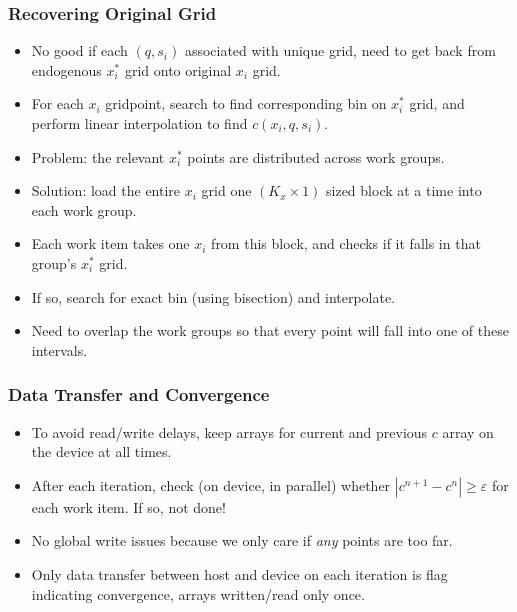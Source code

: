 \documentclass[handout]{beamer}
\newcommand{\eps}{\varepsilon}
\theoremstyle{definition}
\begin{document}
\begin{frame}
  \frametitle{Recovering Original Grid}
  \begin{itemize}[<+->]
  \item No good if each $(q, s_i)$ associated with unique grid, need to get back from endogenous $x_i^*$ grid onto original $x_i$ grid.
  \item For each $x_i$ gridpoint, search to find corresponding bin on $x_i^*$ grid, and perform linear interpolation to find $c(x_i, q, s_i)$.
  \item Problem: the relevant $x_i^*$ points are distributed across work groups.
  \item Solution: load the entire $x_i$ grid one $(K_x \times 1)$ sized block at a time into each work group.
  \item Each work item takes one $x_i$ from this block, and checks if it falls in that group's $x_i^*$ grid.
  \item If so, search for exact bin (using bisection) and interpolate.
  \item Need to overlap the work groups so that every point will fall into one of these intervals.
  \end{itemize}
\end{frame}

\begin{frame}
  \frametitle{Data Transfer and Convergence}
  \begin{itemize}[<+->]
  \item To avoid read/write delays, keep arrays for current and previous $c$ array on the device at all times.
  \item After each iteration, check (on device, in parallel) whether $| c^{n+1} - c^n | \ge \eps$ for each work item. If so, not done!
  \item No global write issues because we only care if \emph{any} points are too far.
  \item Only data transfer between host and device on each iteration is flag indicating convergence, arrays written/read only once.
  \end{itemize}
\end{frame}

\end{document}
